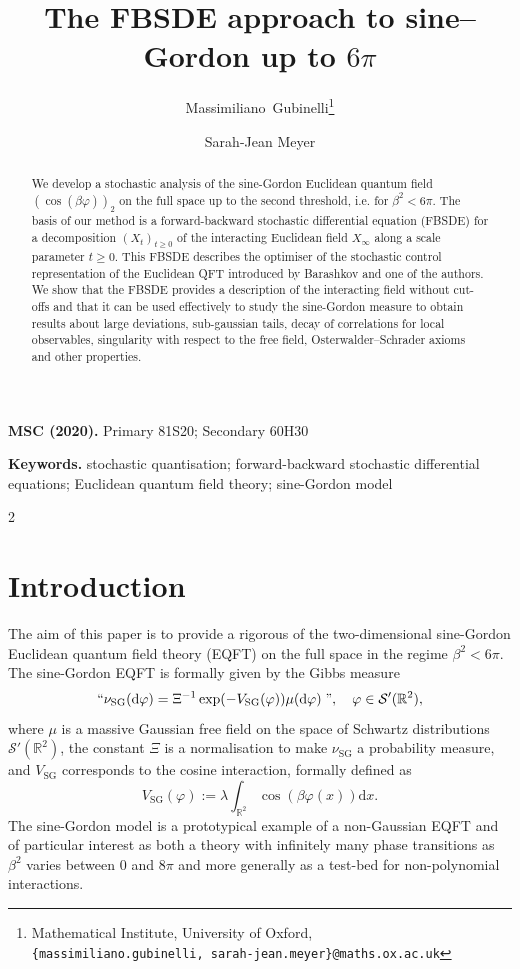 \documentclass[11pt, a4paper]{scrartcl}
\title{The FBSDE approach to sine--Gordon up to $6 \pi$}
\author{
Massimiliano~Gubinelli\thanks{Mathematical Institute, University of Oxford,\\\noindent
\texttt{\{massimiliano.gubinelli, sarah-jean.meyer\}@maths.ox.ac.uk}}
\and
Sarah-Jean Meyer\footnotemark[1]
}
\date{}
\numberwithin{equation}{section}
\theoremstyle{plain}
\theoremstyle{remark}
\newcommand{\assign}{:=}
\newcommand{\mathd}{\mathrm{d}}
\newcommand{\tmop}[1]{\ensuremath{\operatorname{#1}}}
\newcommand{\tmtextit}[1]{\text{{\itshape{#1}}}}
\newcommand{\subjclass}[2][]{%
  \medskip\noindent\textbf{MSC (#1).} #2\par}
\newcommand{\keywords}[1]{%
  \medskip\noindent\textbf{Keywords.} #1\par}
\begin{document}
\maketitle

\begin{abstract}
	We develop a stochastic analysis of the sine-Gordon Euclidean quantum field
	$(\cos (\beta \varphi))_2$ on the full space up to the second threshold,
	i.e. for $\beta^2 < 6 \pi$. The basis of our method is a forward-backward
	stochastic differential equation (FBSDE) for a decomposition $(X_t)_{t
				\geqslant 0}$ of the interacting Euclidean field $X_{\infty}$ along a scale
	parameter $t \geqslant 0$. This FBSDE describes the optimiser of the
	stochastic control representation of the Euclidean QFT introduced by
	Barashkov and one of the authors. We show that the FBSDE provides a
	description of the interacting field without cut-offs and that it can be
	used effectively to study the sine-Gordon measure to obtain results about
	large deviations, sub-gaussian tails, decay of correlations for local
	observables, singularity with respect to the free field,
	Osterwalder--Schrader axioms and other properties.
\end{abstract}

\subjclass[2020]{Primary 81S20; Secondary 60H30}
\keywords{
	stochastic quantisation;
	forward-backward stochastic differential equations;
	Euclidean quantum field theory;
	sine-Gordon model}


\begingroup
\setcounter{tocdepth}{2}
\setlength{\columnsep}{1.2em}
\raggedcolumns
\begin{multicols}{2}
	\tableofcontents
\end{multicols}
\endgroup

\section{Introduction}
The aim of this paper is to provide a rigorous \tmtextit{description} of the
two-dimensional sine-Gordon Euclidean quantum field theory (EQFT) on the full
space in the regime $\beta^2 < 6 \pi$. The sine-Gordon EQFT is formally given
by the Gibbs measure
\begin{equation}
	\text{``}\nu_{\tmop{SG}} (\mathd \varphi) = \Xi^{- 1} \exp (- V_{\tmop{SG}}
	(\varphi)) \mu (\mathd \varphi) \text{{\phantom{.}}''}, \quad \varphi \in
	\mathcal{S}' (\mathbb{R}^2) \label{eq:int-Gibbs-ms},
\end{equation}
where $\mu$ is a massive Gaussian free field on the space of Schwartz
distributions $\mathcal{S}' (\mathbb{R}^2)$, the constant $\Xi$ is a
normalisation to make $\nu_{\tmop{SG}}$ a probability measure, and
$V_{\tmop{SG}}$ corresponds to the cosine interaction, formally defined as
\[ V_{\tmop{SG}} (\varphi) \assign \lambda \int_{\mathbb{R}^2} \cos (\beta
	\varphi (x)) \mathd x. \]
The sine-Gordon model is a prototypical example of a non-Gaussian EQFT and of
particular interest as both a theory with infinitely many phase transitions as
$\beta^2$ varies between $0$ and $8 \pi$ and more generally as a test-bed for
non-polynomial interactions.
\end{document}
